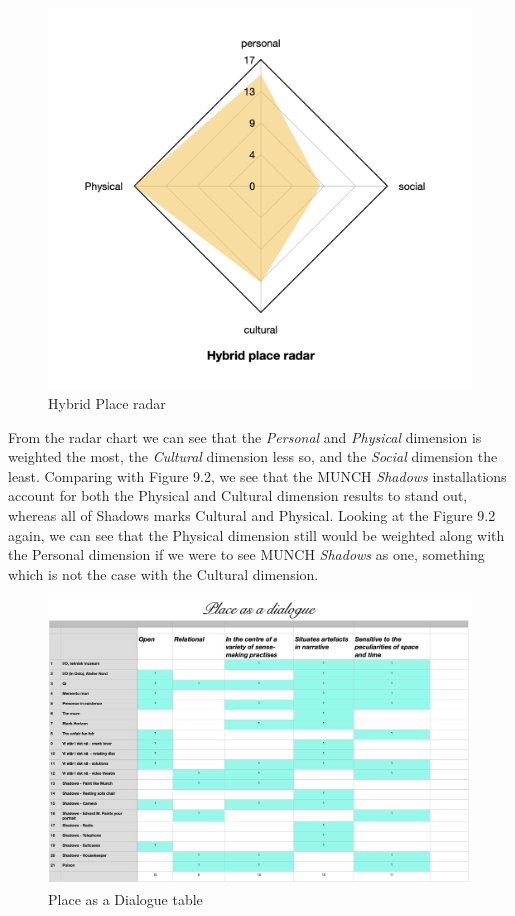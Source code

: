 \begin{figure}[H]
\includegraphics[width=12.5cm]{pictures/analysis/hybrid_radar.png}
\caption{Hybrid Place radar}
\centering 
\end{figure}

From the radar chart we can see that the \textit{Personal} and \textit{Physical} dimension is weighted the most, the \textit{Cultural} dimension less so, and the \textit{Social} dimension the least. Comparing with Figure 9.2, we see that the MUNCH \textit{Shadows} installations account for both the Physical and Cultural dimension results to stand out, whereas all of Shadows marks Cultural and Physical. Looking at the Figure 9.2 again, we can see that the Physical dimension still would be weighted along with the Personal dimension if we were to see MUNCH \textit{Shadows} as one, something which is not the case with the Cultural dimension.


\begin{figure}[H]
\includegraphics[width=20cm, angle=90]{pictures/analysis/place.png}
\caption{Place as a Dialogue table}
\centering 
\end{figure}

